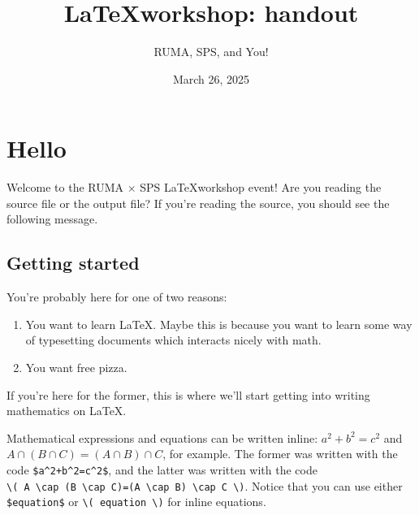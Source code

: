 \documentclass{article}
\title{\LaTeX workshop: handout}
\author{RUMA, SPS, and You!}
\date{March 26, 2025}
\begin{document}
\maketitle %

\section{Hello} %
Welcome to the RUMA$\,\times\,$SPS \LaTeX workshop event! Are you reading the source file or the output file? If you're reading the source, you should see the following message. %



\subsection{Getting started} %
You're probably here for one of two reasons:
\begin{enumerate}
    \item You want to learn \LaTeX. Maybe this is because you want to learn some way of typesetting documents which interacts nicely with math.
    \item You want free pizza.
\end{enumerate}
If you're here for the former, this is where we'll start getting into writing mathematics on \LaTeX.

Mathematical expressions and equations can be written inline: $a^2+b^2=c^2$ and \( A \cap (B \cap C)=(A \cap B) \cap C \), for example. The former was written with the code \texttt{\$a\^{}2+b\^{}2=c\^{}2\$}, and the latter was written with the code \\ \texttt{\textbackslash( A \textbackslash cap (B \textbackslash cap C)=(A \textbackslash cap B) \textbackslash cap C \textbackslash)}. Notice that you can use either \texttt{\$equation\$} or \texttt{\textbackslash( equation \textbackslash)} for inline equations.
\end{document}
